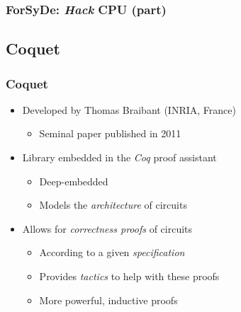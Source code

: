         \begin{frame}
            \frametitle{ForSyDe: \emph{Hack} CPU (part)}
        \end{frame}


    \subsection{Coquet}
    \label{subsec:coquet}
        \begin{frame}
            \frametitle{Coquet}

            \begin{itemize}
                \item Developed by Thomas Braibant (INRIA, France)
                    \begin{itemize}
                        \item Seminal paper published in 2011
                    \end{itemize}
                \item Library embedded in the \emph{Coq} proof assistant
                    \begin{itemize}
                        \item Deep-embedded
                        \item Models the \emph{architecture} of circuits
                    \end{itemize}
                \item Allows for \emph{correctness proofs} of circuits
                    \begin{itemize}
                        \item According to a given \emph{specification}
                        \item Provides \emph{tactics} to help with these proofs
                        \item More powerful, inductive proofs
                    \end{itemize}
            \end{itemize}

        \end{frame}

